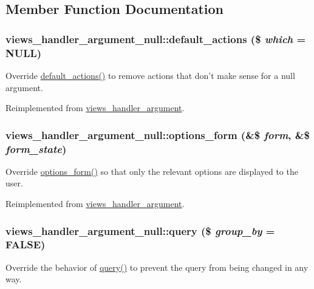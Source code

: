 \subsection{Member Function Documentation}
\hypertarget{classviews__handler__argument__null_a82da8fd1448e1ce346aa38d5b6021e05}{
\subsubsection[{default\_\-actions}]{\setlength{\rightskip}{0pt plus 5cm}views\_\-handler\_\-argument\_\-null::default\_\-actions (\$ {\em which} = {\ttfamily NULL})}}
\label{classviews__handler__argument__null_a82da8fd1448e1ce346aa38d5b6021e05}
Override \hyperlink{classviews__handler__argument__null_a82da8fd1448e1ce346aa38d5b6021e05}{default\_\-actions()} to remove actions that don't make sense for a null argument. 

Reimplemented from \hyperlink{classviews__handler__argument_abf38ef334b6e18e0aa43e5a829e3ce33}{views\_\-handler\_\-argument}.\hypertarget{classviews__handler__argument__null_a414f383de12d08f6e1e5eccb572cf9c8}{
\subsubsection[{options\_\-form}]{\setlength{\rightskip}{0pt plus 5cm}views\_\-handler\_\-argument\_\-null::options\_\-form (\&\$ {\em form}, \/  \&\$ {\em form\_\-state})}}
\label{classviews__handler__argument__null_a414f383de12d08f6e1e5eccb572cf9c8}
Override \hyperlink{classviews__handler__argument__null_a414f383de12d08f6e1e5eccb572cf9c8}{options\_\-form()} so that only the relevant options are displayed to the user. 

Reimplemented from \hyperlink{classviews__handler__argument_a44f015a0d527983ae6df2689f66b2c24}{views\_\-handler\_\-argument}.\hypertarget{classviews__handler__argument__null_ab2358d01dc1374da42a1ae45dff90dae}{
\subsubsection[{query}]{\setlength{\rightskip}{0pt plus 5cm}views\_\-handler\_\-argument\_\-null::query (\$ {\em group\_\-by} = {\ttfamily FALSE})}}
\label{classviews__handler__argument__null_ab2358d01dc1374da42a1ae45dff90dae}
Override the behavior of \hyperlink{classviews__handler__argument__null_ab2358d01dc1374da42a1ae45dff90dae}{query()} to prevent the query from being changed in any way. 

